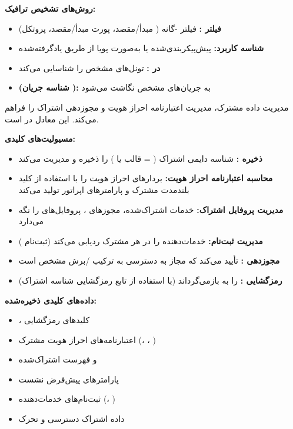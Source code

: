 \textbf{روش‌های تشخیص ترافیک:}

\begin{itemize}
\tightlist
\item
  \textbf{فیلتر :} فیلتر -گانه ( مبدأ/\allowbreak{}مقصد، پورت مبدأ/\allowbreak{}مقصد، پروتکل)
\item
  \textbf{شناسه کاربرد:} پیش‌پیکربندی‌شده یا به‌صورت پویا از طریق  یادگرفته‌شده
\item
  \textbf{ در :} تونل‌های  مشخص را شناسایی می‌کند
\item
  \textbf{ (شناسه جریان ):} به جریان‌های  مشخص نگاشت می‌شود
\end{itemize}


 مدیریت داده مشترک، مدیریت اعتبارنامه احراز هویت و مجوزدهی اشتراک را فراهم می‌کند. این معادل  در  است.

\textbf{مسیولیت‌های کلیدی:}

\begin{itemize}
\tightlist
\item
  \textbf{ذخیره :} شناسه دایمی اشتراک ( = قالب  یا ) را ذخیره و مدیریت می‌کند
\item
  \textbf{محاسبه اعتبارنامه احراز هویت:} بردارهای احراز هویت  را با استفاده از کلید بلندمدت مشترک  و پارامترهای اپراتور  تولید می‌کند
\item
  \textbf{مدیریت پروفایل اشتراک:} خدمات اشتراک‌شده، مجوزهای ، پروفایل‌های  را نگه می‌دارد
\item
  \textbf{مدیریت ثبت‌نام:}  خدمات‌دهنده را در هر مشترک ردیابی می‌کند (ثبت‌نام )
\item
  \textbf{مجوزدهی :} تأیید می‌کند که  مجاز به دسترسی به ترکیب /\allowbreak{}برش مشخص است
\item
  \textbf{رمزگشایی :}  را به  بازمی‌گرداند (با استفاده از   تابع رمزگشایی شناسه اشتراک)
\end{itemize}

\textbf{داده‌های کلیدی ذخیره‌شده:}

\begin{itemize}
\tightlist
\item
  ، کلیدهای رمزگشایی 
\item
  اعتبارنامه‌های احراز هویت مشترک (، ، )
\item
   و فهرست  اشتراک‌شده
\item
  پارامترهای  پیش‌فرض نشست
\item
  ثبت‌نام‌های  خدمات‌دهنده (، )
\item
  داده اشتراک دسترسی و تحرک
\end{itemize}

